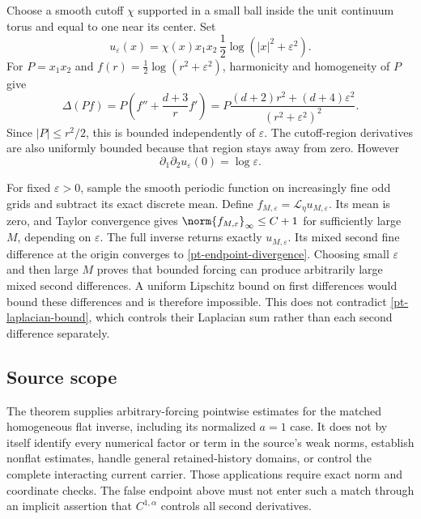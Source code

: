 Choose a smooth cutoff $\chi$ supported in a small ball inside the
unit continuum torus and equal to one near its center. Set
\begin{equation}\label{pt-endpoint-example}
 u_\varepsilon(x)=\chi(x)x_1x_2\,
                       \frac12\log(|x|^2+\varepsilon^2).
\end{equation}
For $P=x_1x_2$ and $f(r)=\frac12\log(r^2+\varepsilon^2)$,
harmonicity and homogeneity of $P$ give
\begin{equation}\label{pt-endpoint-laplacian}
 \Delta(Pf)=P\left(f''+\frac{d+3}{r}f'\right)
   =P\frac{(d+2)r^2+(d+4)\varepsilon^2}
                  {(r^2+\varepsilon^2)^2}.
\end{equation}
Since $|P|\le r^2/2$, this is bounded independently of $\varepsilon$.
The cutoff-region derivatives are also uniformly bounded because
that region stays away from zero. However
\begin{equation}\label{pt-endpoint-divergence}
 \partial_1\partial_2u_\varepsilon(0)=\log\varepsilon.
\end{equation}

For fixed $\varepsilon>0$, sample the smooth periodic function on
increasingly fine odd grids and subtract its exact discrete mean.
Define $f_{M,\varepsilon}=\mathcal L_\eta u_{M,\varepsilon}$.
Its mean is zero, and Taylor convergence gives
$\norm{f_{M,\varepsilon}}_\infty\le C+1$ for sufficiently large
$M$, depending on $\varepsilon$. The full inverse returns exactly
$u_{M,\varepsilon}$. Its mixed second fine difference at the origin
converges to \eqref{pt-endpoint-divergence}. Choosing small
$\varepsilon$ and then large $M$ proves that bounded forcing can
produce arbitrarily large mixed second differences. A uniform
Lipschitz bound on first differences would bound these differences
and is therefore impossible. This does not contradict
\eqref{pt-laplacian-bound}, which controls their Laplacian sum rather
than each second difference separately.

\subsection{Source scope}

The theorem supplies arbitrary-forcing pointwise estimates for the
matched homogeneous flat inverse, including its normalized $a=1$
case. It does not by itself identify every numerical factor or term
in the source's weak norms, establish nonflat estimates, handle
general retained-history domains, or control the complete interacting
current carrier. Those applications require exact norm and coordinate
checks. The false endpoint above must not enter such a match through
an implicit assertion that $C^{1,\alpha}$ controls all second derivatives.
